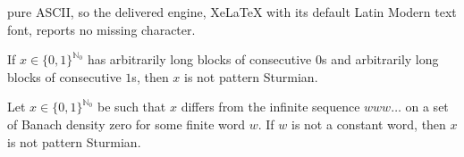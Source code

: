 \documentclass[10pt,a4paper]{amsart}
\newcommand{\N}{\mathbb{N}}
\begin{document}
pure ASCII, so the delivered engine, XeLaTeX with its default Latin Modern text font, reports no missing character.
\begin{lemma}\label{lem:long_0_and_1_not_pattern_Sturmian}
If $x \in \{0, 1\}^{\N_0}$ has arbitrarily long blocks of consecutive $0$s and arbitrarily long blocks of consecutive $1$s, then $x$ is not pattern Sturmian. 
\end{lemma}

\begin{proposition}\label{prop:w-constant}
Let $x \in \{0, 1\}^{\N_0}$ be such that $x$ differs from the infinite sequence $w w w \ldots$ on a set of Banach density zero for some finite word $w$. If $w$ is not a constant word, then $x$ is not pattern Sturmian. 
\end{proposition}
\end{document}
